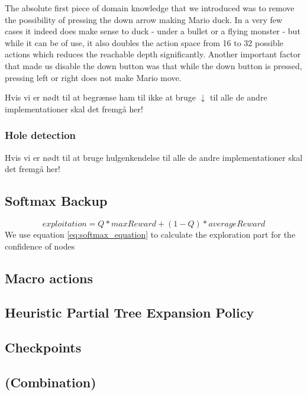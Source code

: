 \documentclass[10pt,a4paper]{article}
\begin{document}

The absolute first piece of domain knowledge that we introduced was to remove the possibility of pressing the down arrow making Mario duck. In a very few cases it indeed does make sense to duck - under a bullet or a flying monster - but while it can be of use, it also doubles the action space from 16 to 32 possible actions which reduces the reachable depth significantly.
Another important factor that made us disable the down button was that while the down button is pressed, pressing left or right does not make Mario move. %


Hvis vi er nødt til at begrænse ham til ikke at bruge $\downarrow$ til alle de andre implementationer skal det fremgå her!
\subsubsection{Hole detection}
Hvis vi er nødt til at bruge hulgenkendelse til alle de andre implementationer skal det fremgå her!
\subsection{Softmax Backup}
\begin{equation}\label{eq:softmax_equation}
exploitation = Q * maxReward + (1 - Q ) * averageReward
\end{equation}
We use equation \ref{eq:softmax_equation} to calculate the exploration part for the confidence of nodes
\subsection{Macro actions}
\cite{salesman}
\subsection{Heuristic Partial Tree Expansion Policy}
\subsection{Checkpoints}
\subsection{(Combination)}
\clearpage
\end{document}
